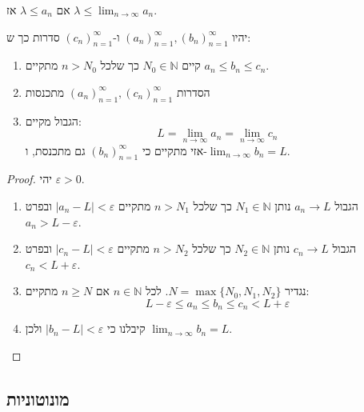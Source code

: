 \documentclass{tstextbook}
\begin{document}
\begin{corollary}
אם \(\lambda \leq a_{n}\) אז \(\lambda \leq \lim_{ n \to \infty }a_{n}\).

\end{corollary}
\begin{theorem}[הכריך]
יהיו \((a_n)_{n=1}^\infty,(b_{n})_{n=1}^\infty\) ו-\((c_n)_{n=1}^\infty\) סדרות כך ש:

  \begin{enumerate}
    \item קיים \(N_{0} \in \mathbb{N}\) כך שלכל \(n>N_{0}\) מתקיים \(a_{n}\leq b_{n}\leq c_{n}\). 


    \item הסדרות \((a_n)_{n=1}^\infty,(c_n)_{n=1}^\infty\) מתכנסות 


    \item הגבול מקיים: 
$$L=\lim_{ n \to \infty } a_{n}=\lim_{ n \to \infty }c_{n} $$
אזי מתקיים כי \((b_{n})_{n=1}^\infty\) גם מתכנסת, ו-\(\lim_{ n \to \infty }b_{n}=L\).


  \end{enumerate}
\end{theorem}
\begin{proof}
יהי \(\varepsilon>0\).

  \begin{enumerate}
    \item הגבול \(a_{n}\to L\) נותן \(N_{1} \in \mathbb{N}\) כך שלכל \(n>N_{1}\) מתקיים \(|a_{n}-L|<\varepsilon\) ובפרט \(a_{n}>L-\varepsilon\). 


    \item הגבול \(c_{n}\to L\) נותן \(N_{2} \in \mathbb{N}\) כך שלכל \(n>N_{2}\) מתקיים \(|c_{n}-L|<\varepsilon\) ובפרט \(c_{n}<L+\varepsilon\). 


    \item נגדיר \(N=\max\{ N_{0},N_{1},N_{2} \}\). לכל \(n \in \mathbb{N}\) אם \(n\geq N\) מתקיים: 
$$L-\varepsilon \leq a_{n}\leq b_{n}\leq c_{n}<L+\varepsilon$$


    \item קיבלנו כי \(|b_{n}-L|<\varepsilon\) ולכן \(\lim_{ n \to \infty }b_{n}=L\). 


  \end{enumerate}
\end{proof}
\subsection{מונוטוניות}
\end{document}
